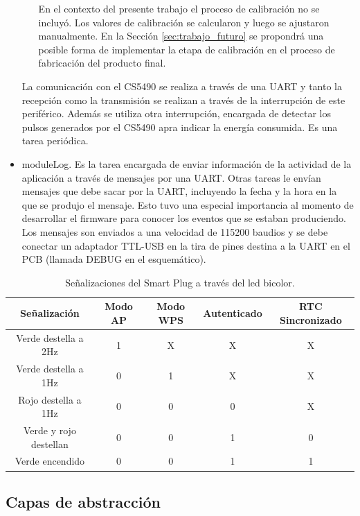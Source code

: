 \begin{itemize}
\begin{itemize}
En el contexto del presente trabajo el proceso de calibración no se incluyó. Los valores de calibración se calcularon y luego se ajustaron manualmente. En la Sección \ref{sec:trabajo_futuro} se propondrá una posible forma de implementar la etapa de calibración en el proceso de fabricación del producto final.
\end{itemize}

La comunicación con el CS5490 se realiza a través de una UART y tanto la recepción como la transmisión se realizan a través de la interrupción de este periférico. Además se utiliza otra interrupción, encargada de detectar los pulsos generados por el CS5490 apra indicar la energía consumida.
Es una tarea periódica.

\item moduleLog. Es la tarea encargada de enviar información de la actividad de la aplicación a través de mensajes por una UART. Otras tareas le envían mensajes que debe sacar por la UART, incluyendo la fecha y la hora en la que se produjo el mensaje. Esto tuvo una especial importancia al momento de desarrollar el firmware para conocer los eventos que se estaban produciendo. Los mensajes son enviados a una velocidad de 115200 baudios y se debe conectar un adaptador TTL-USB en la tira de pines destina a la UART en el PCB (llamada DEBUG en el esquemático).

\end{itemize}


\begin{table}[h]
	\centering
	\caption[Señalizaciones del Smart Plug]{Señalizaciones del Smart Plug a través del led bicolor.}
	\begin{tabular}{c c c c c}    
		\toprule
		\textbf{Señalización} 	 & \textbf{Modo AP}  & \textbf{Modo WPS}  & \textbf{Autenticado}  & \textbf{RTC Sincronizado} \\
		\midrule
		Verde destella a 2Hz	 	& 1  & X  & X  & X \\		
		Verde destella a 1Hz	 	& 0  & 1  & X  & X \\
		Rojo destella a 1Hz	 		& 0  & 0  & 0  & X \\
		Verde y rojo destellan	 	& 0  & 0  & 1  & 0 \\
		Verde encendido	 			& 0  & 0  & 1  & 1 \\
		\bottomrule
		\hline
	\end{tabular}
	\label{tab:senializacion_leds}
\end{table}


\subsection{Capas de abstracción}

